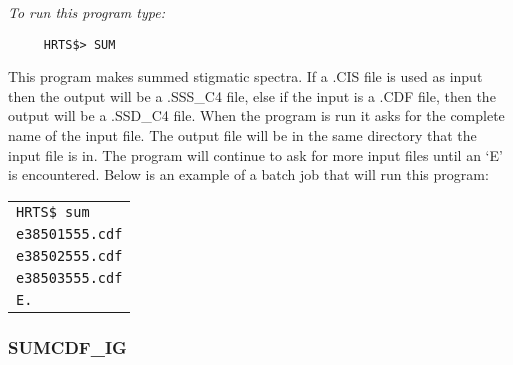 {\em To run this program type:}
\begin{verbatim}
     HRTS$> SUM               
\end{verbatim}
      This program makes summed stigmatic spectra. If a .CIS file is used
   as input then the output will be a .SSS\_C4 file, else if the input is a
   .CDF file, then the output will be a .SSD\_C4 file.
      When the program is run it asks for the complete name of the input
   file. The output file will be in the same directory that the input file
   is in. The program will continue to ask for more input files until an
   `E' is encountered.
      Below is an example of a batch job that will run this program:   
\begin{center}
\begin{tabular}{||l||}
\hline

                    {\tt HRTS\$  sum} \\                         
                    {\tt e38501555.cdf} \\                  
                    {\tt e38502555.cdf} \\                  
                    {\tt e38503555.cdf} \\                  
                    {\tt E.} \\                              
\hline
\end{tabular}   
\end{center}   

\subsubsection{SUMCDF\_IG}

